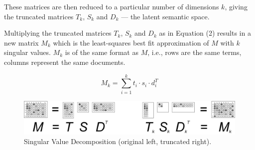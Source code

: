 \documentclass[article]{jss}
\begin{document}
These matrices are then reduced to a particular number of 
dimensions \begin{math}k\end{math}, giving the truncated matrices \begin{math}T_{k}\end{math}, 
\begin{math}S_{k}\end{math} and \begin{math}D_{k}\end{math} --- the latent semantic space. 

Multiplying the truncated matrices \begin{math}T_{k}\end{math}, 
\begin{math}S_{k}\end{math} and \begin{math}D_{k}\end{math} as in Equation (2) 
results in a new matrix \begin{math}M_{k}\end{math} which is the least-squares best 
fit approximation of \begin{math}M\end{math} with \begin{math}k\end{math} 
singular values. \begin{math}M_{k}\end{math} is of the same format as 
\begin{math}M\end{math}, i.e., rows are the same terms, columns represent
the same documents.

\begin{equation}M_k = \sum\limits_{i=1}^k t_i \cdot s_i \cdot d_i^T\end{equation}

\begin{figure}\label{fig:process}
  \centering
  \includegraphics[width=140mm]{lsa_process.jpg}
  \caption{Singular Value Decomposition (original left, truncated right).}
\end{figure}
\end{document}
